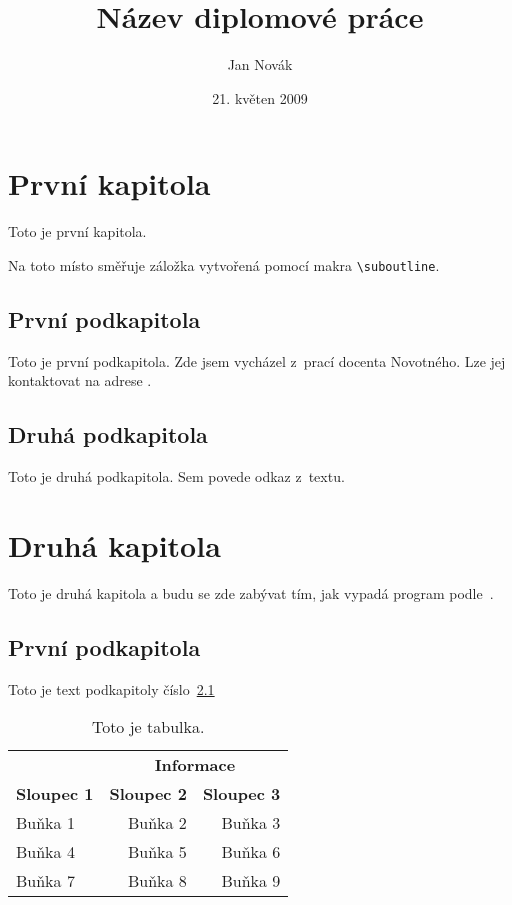 \documentclass[12pt]{article}
\title{Název diplomové práce}
\author{Jan Novák}
\date{21. květen 2009}
\begin{document}
\maketitle
\newpage


\section{První kapitola}
Toto je první kapitola.

\medskip
{}
Na toto místo směřuje záložka vytvořená pomocí makra \verb|\suboutline|.

\subsection{První podkapitola}
Toto je první podkapitola.
Zde jsem vycházel z~prací docenta Novotného. Lze jej kontaktovat
na adrese .


\subsection{Druhá podkapitola}
Toto je druhá podkapitola. Sem povede odkaz z~textu.


\newpage
\section{Druhá kapitola}
Toto je druhá kapitola a budu se zde zabývat tím, jak vypadá
program podle~\cite{smith}.

\subsection{První podkapitola}\label{kapX}
Toto je text podkapitoly číslo~\ref{kapX}
\begin{table}[ht]
  \begin{center}
    \renewcommand{\arraystretch}{1.2}
    \begin{tabular}{||l|rr||}
      \hline
      & \multicolumn{2}{|c||}{\bf \hbox{Informace}} \\
      \cline{2-3}
      \bf Sloupec 1 & \bf Sloupec 2 & \bf Sloupec 3 \\
      \hline
      Buňka 1 & Buňka 2 & Buňka 3 \\
      Buňka 4 & Buňka 5 & Buňka 6 \\
      Buňka 7 & Buňka 8 & Buňka 9 \\
      \hline
    \end{tabular}
    \caption{Toto je tabulka.} \label{tab}
  \end{center}
\end{table}
\end{document}
